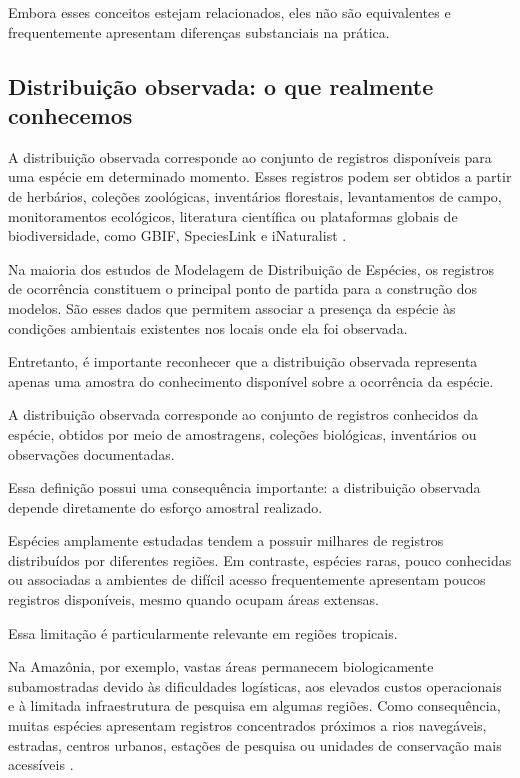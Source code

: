 Embora esses conceitos estejam relacionados, eles não são equivalentes e frequentemente apresentam diferenças substanciais na prática.

\subsection{Distribuição observada: o que realmente conhecemos}

A distribuição observada corresponde ao conjunto de registros disponíveis para uma espécie em determinado momento. Esses registros podem ser obtidos a partir de herbários, coleções zoológicas, inventários florestais, levantamentos de campo, monitoramentos ecológicos, literatura científica ou plataformas globais de biodiversidade, como GBIF, SpeciesLink e iNaturalist \parencite{hijmans2021,gbif2024}.

Na maioria dos estudos de Modelagem de Distribuição de Espécies, os registros de ocorrência constituem o principal ponto de partida para a construção dos modelos. São esses dados que permitem associar a presença da espécie às condições ambientais existentes nos locais onde ela foi observada.

Entretanto, é importante reconhecer que a distribuição observada representa apenas uma amostra do conhecimento disponível sobre a ocorrência da espécie.

\begin{conceito}
	A distribuição observada corresponde ao conjunto de registros conhecidos da espécie, obtidos por meio de amostragens, coleções biológicas, inventários ou observações documentadas.
\end{conceito}

Essa definição possui uma consequência importante: a distribuição observada depende diretamente do esforço amostral realizado.

Espécies amplamente estudadas tendem a possuir milhares de registros distribuídos por diferentes regiões. Em contraste, espécies raras, pouco conhecidas ou associadas a ambientes de difícil acesso frequentemente apresentam poucos registros disponíveis, mesmo quando ocupam áreas extensas.

Essa limitação é particularmente relevante em regiões tropicais.

Na Amazônia, por exemplo, vastas áreas permanecem biologicamente subamostradas devido às dificuldades logísticas, aos elevados custos operacionais e à limitada infraestrutura de pesquisa em algumas regiões. Como consequência, muitas espécies apresentam registros concentrados próximos a rios navegáveis, estradas, centros urbanos, estações de pesquisa ou unidades de conservação mais acessíveis \parencite{nelson1990,feeley2005}.

